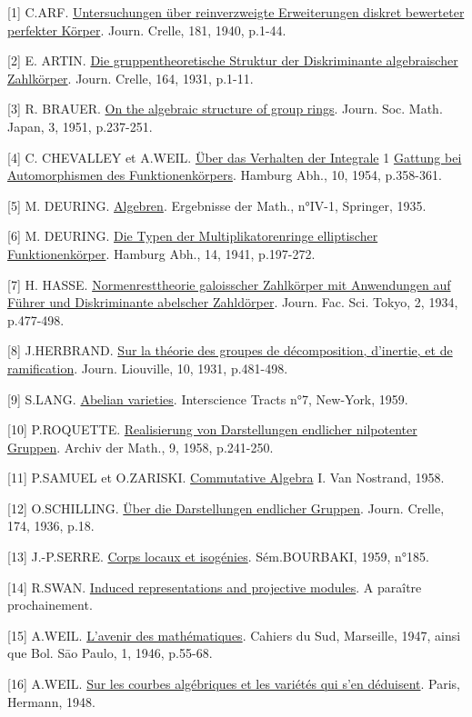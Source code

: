 \begin{center}\end{center}

[1] C.ARF. \uline{Untersuchungen über reinverzweigte Erweiterungen diskret bewerteter perfekter Körper}. Journ. Crelle, 181, 1940, p.1-44.

[2] E. ARTIN. \uline{Die gruppentheoretische Struktur der Diskriminante algebraischer Zahlkörper}. Journ. Crelle, 164, 1931, p.1-11.

[3] R. BRAUER. \uline{On the algebraic structure of group rings}. Journ. Soc. Math. Japan, 3, 1951, p.237-251.

[4] C. CHEVALLEY et A.WEIL. \uline{Über das Verhalten der Integrale} 1 \uline{Gattung bei Automorphismen des Funktionenkörpers}. Hamburg Abh., 10, 1954, p.358-361.

[5] M. DEURING. \uline{Algebren}. Ergebnisse der Math., n°IV-1, Springer, 1935.

[6] M. DEURING. \uline{Die Typen der Multiplikatorenringe elliptischer Funktionenkörper}. Hamburg Abh., 14, 1941, p.197-272.

[7] H. HASSE. \uline{Normenresttheorie galoisscher Zahlkörper mit Anwendungen auf Führer und Diskriminante abelscher Zahldörper}. Journ. Fac. Sci. Tokyo, 2, 1934, p.477-498.

[8] J.HERBRAND. \uline{Sur la théorie des groupes de décomposition, d'inertie, et de ramification}. Journ. Liouville, 10, 1931, p.481-498.

[9] S.LANG. \uline{Abelian varieties}. Interscience Tracts n°7, New-York, 1959.

[10] P.ROQUETTE. \uline{Realisierung von Darstellungen endlicher nilpotenter Gruppen}. Archiv der Math., 9, 1958, p.241-250.

[11] P.SAMUEL et O.ZARISKI. \uline{Commutative Algebra} I. Van Nostrand, 1958.

[12] O.SCHILLING. \uline{Über die Darstellungen endlicher Gruppen}. Journ. Crelle, 174, 1936, p.18.

[13] J.-P.SERRE. \uline{Corps locaux et isogénies}. Sém.BOURBAKI, 1959, n°185.

[14] R.SWAN. \uline{Induced representations and projective modules}. A paraître prochainement.

[15] A.WEIL. \uline{L'avenir des mathématiques}. Cahiers du Sud, Marseille, 1947, ainsi que Bol. S\={a}o Paulo, 1, 1946, p.55-68.

[16] A.WEIL. \uline{Sur les courbes algébriques et les variétés qui s'en déduisent}. Paris, Hermann, 1948.

